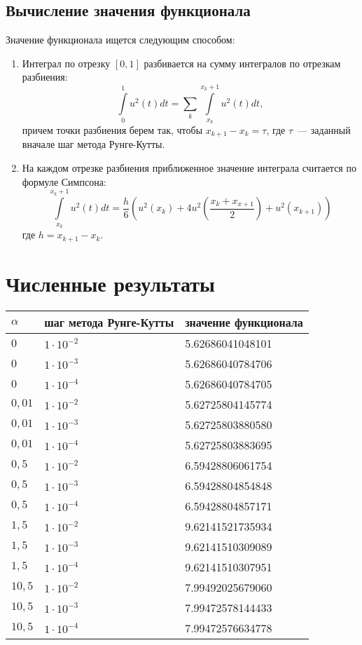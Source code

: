 \documentclass[24pt]{article}
\begin{document}
\subsection{Вычисление значения функционала}
Значение функционала ищется следующим способом:\\
\begin{enumerate}
\item 
Интеграл по отрезку $[0,1]$ разбивается на сумму интегралов по отрезкам разбиения:
$$ \int\limits_0^1 u^2(t) dt = \sum\limits_k\int\limits_{x_k}^{x_k+1}u^2(t)dt,$$ причем точки разбиения берем так, чтобы  $x_{k+1}-x_{k} = \tau$, где $\tau$~--- заданный вначале шаг метода Рунге-Кутты.
\item
На каждом отрезке разбиения приближенное значение интеграла считается по формуле Симпсона:\\
$$\int\limits_{x_k}^{x_k+1}u^2(t)dt = \frac{h}{6}\left(u^2\left(x_k\right) + 4u^2\left(\frac{x_k + x_{x+1}}{2}\right)+u^2\left(x_{k+1}\right)\right)$$
где $h = x_{k+1}-x_{k}$.
\end{enumerate}
\section{Численные результаты}
\begin{tabular}[t]{||l|l|l||}
\hline
$\alpha$ & шаг метода Рунге-Кутты & значение функционала\\
\hline\hline
$0$& $1\cdot 10^{-2}$ & 5.62686041048101\\
\hline
$0$& $1\cdot 10^{-3}$ & 5.62686040784706\\
\hline
$0$& $1\cdot 10^{-4}$ & 5.62686040784705\\
\hline
$0{,}01$& $1\cdot 10^{-2}$ & 5.62725804145774\\
\hline
$0{,}01$& $1\cdot 10^{-3}$ & 5.62725803880580\\
\hline
$0{,}01$& $1\cdot 10^{-4}$ & 5.62725803883695\\
\hline
$0{,}5$& $1\cdot 10^{-2}$ & 6.59428806061754\\
\hline
$0{,}5$& $1\cdot 10^{-3}$ & 6.59428804854848\\
\hline
$0{,}5$& $1\cdot 10^{-4}$ & 6.59428804857171\\
\hline
$1{,}5$& $1\cdot 10^{-2}$ & 9.62141521735934\\
\hline
$1{,}5$& $1\cdot 10^{-3}$ & 9.62141510309089\\
\hline
$1{,}5$& $1\cdot 10^{-4}$ & 9.62141510307951\\
\hline
$10{,}5$& $1\cdot 10^{-2}$ & 7.99492025679060\\
\hline
$10{,}5$& $1\cdot 10^{-3}$ & 7.99472578144433\\
\hline
$10{,}5$& $1\cdot 10^{-4}$ & 7.99472576634778\\
\hline
\end{tabular}
\end{document}
